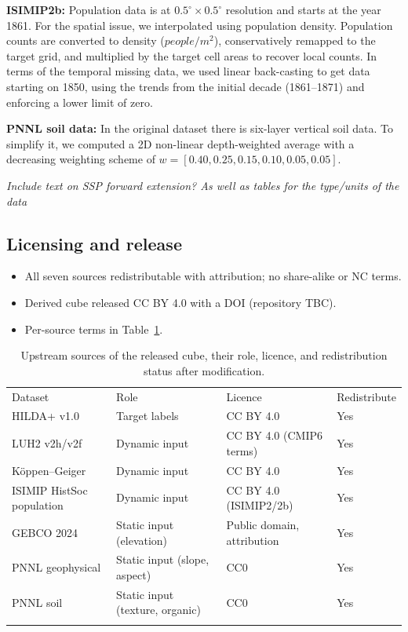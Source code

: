 \documentclass[gmd, manuscript]{copernicus}
\begin{document}
\textbf{ISIMIP2b:} Population data is at $0.5^{\circ} \times 0.5^{\circ}$ resolution and starts at the year 1861. For the spatial issue, we interpolated using population density. Population counts are converted to density ($people/m^2$), conservatively remapped to the target grid, and multiplied by the target cell areas to recover local counts. In terms of the temporal missing data, we used linear back-casting to get data starting on 1850, using the trends from the initial decade (1861–1871) and enforcing a lower limit of zero.

\textbf{PNNL soil data:} In the original dataset there is six-layer vertical soil data. To simplify it, we computed a 2D non-linear depth-weighted average with a decreasing weighting scheme of $w = [0.40, 0.25, 0.15, 0.10, 0.05, 0.05]$.

\textit{Include text on SSP forward extension? As well as tables for the type/units of the data}

\subsection{Licensing and release}
\begin{itemize}
\item All seven sources redistributable with attribution; no share-alike or NC terms.
\item Derived cube released CC BY 4.0 with a DOI (repository TBC).
\item Per-source terms in Table~\ref{tab:licences}.
\end{itemize}

\begin{table}[t]
\caption{Upstream sources of the released cube, their role, licence, and
redistribution status after modification.}
\label{tab:licences}
\begin{tabular}{llll}
\tophline
Dataset & Role & Licence & Redistribute \\
\middlehline
HILDA+ v1.0 \citep{winkler2020hilda+}        & Target labels             & CC BY 4.0                  & Yes \\
LUH2 v2h/v2f \citep{hurtt2020harmonization}  & Dynamic input             & CC BY 4.0 (CMIP6 terms)    & Yes \\
K{\"o}ppen--Geiger \citep{beck2018present}   & Dynamic input             & CC BY 4.0                  & Yes \\
ISIMIP HistSoc population \citep{frieler2017assessing} & Dynamic input   & CC BY 4.0 (ISIMIP2/2b)     & Yes \\
GEBCO 2024 \citep{GEBCO2024}                 & Static input (elevation)  & Public domain, attribution & Yes \\
PNNL geophysical \citep{li2024global}        & Static input (slope, aspect) & CC0                     & Yes \\
PNNL soil \citep{li2024global}               & Static input (texture, organic) & CC0                  & Yes \\
\bottomhline
\end{tabular}
\end{table}
\end{document}
